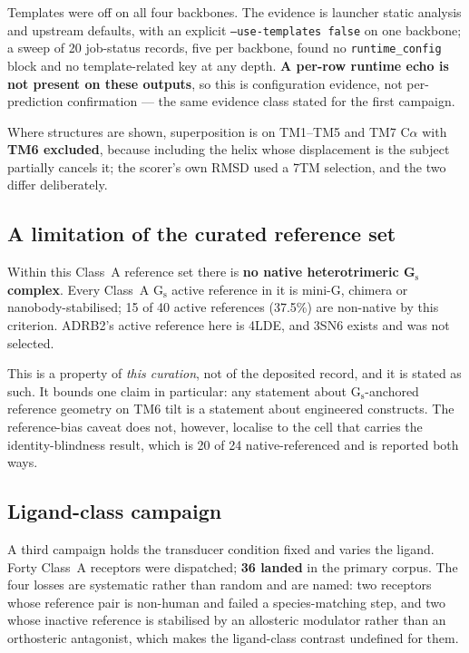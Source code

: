 Templates were off on all four backbones. The evidence is launcher static
analysis and upstream defaults, with an explicit \texttt{--use-templates false}
on one backbone; a sweep of 20 job-status records, five per backbone, found no
\texttt{runtime\_config} block and no template-related key at any depth.
\textbf{A per-row runtime echo is not present on these outputs}, so this is
configuration evidence, not per-prediction confirmation --- the same evidence
class stated for the first campaign.

Where structures are shown, superposition is on TM1--TM5 and TM7 C$\alpha$ with
\textbf{TM6 excluded}, because including the helix whose displacement is the
subject partially cancels it; the scorer's own RMSD used a 7TM selection, and
the two differ deliberately.

\subsection*{A limitation of the curated reference set}

Within this Class~A reference set there is \textbf{no native heterotrimeric
G$_\mathrm{s}$ complex}. Every Class~A G$_\mathrm{s}$ active reference in it is
mini-G, chimera or nanobody-stabilised; 15 of 40 active references (37.5\%) are
non-native by this criterion. ADRB2's active reference here is 4LDE, and 3SN6
exists and was not selected.

This is a property of \emph{this curation}, not of the deposited record, and it
is stated as such. It bounds one claim in particular: any statement about
G$_\mathrm{s}$-anchored reference geometry on TM6 tilt is a statement about
engineered constructs. The reference-bias caveat does not, however, localise to
the cell that carries the identity-blindness result, which is 20 of 24
native-referenced and is reported both ways.

\subsection*{Ligand-class campaign}

A third campaign holds the transducer condition fixed and varies the ligand.
Forty Class~A receptors were dispatched; \textbf{36 landed} in the primary
corpus. The four losses are systematic rather than random and are named: two
receptors whose reference pair is non-human and failed a species-matching step,
and two whose inactive reference is stabilised by an allosteric modulator rather
than an orthosteric antagonist, which makes the ligand-class contrast undefined
for them.

